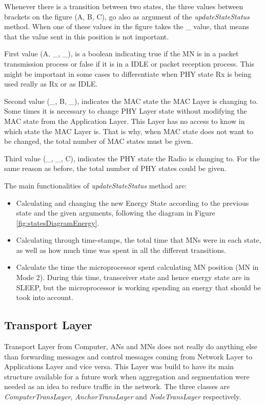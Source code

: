 Whenever there is a transition between two states, the three values between brackets on the figure (A, B, C), go also as argument of the 
\textit{updateStateStatus} method. When one of these values in the figure takes the \_ value, that means that the value sent
in this position is not important.

First value (A, \_, \_), is a boolean indicating true if the \ac{MN} is in a packet transmission process or false if it is in a IDLE or packet 
reception process. This might be important in some cases to differentiate when \ac{PHY} state \ac{Rx} is being used really as \ac{Rx} or as
IDLE.

Second value (\_, B, \_), indicates the \ac{MAC} state the \ac{MAC} Layer is changing to. Some times it is necessary to change \ac{PHY} Layer state
without modifying the \ac{MAC} state from the Application Layer. This Layer has no access to know in which state the \ac{MAC} Layer is. That is
why, when \ac{MAC} state does not want to be changed, the total number of \ac{MAC} states must be given.

Third value (\_, \_, C), indicates the \ac{PHY} state the Radio is changing to. For the same reason as before, the total number of \ac{PHY} states
could be given.

The main functionalities of \textit{updateStateStatus} method are:
\begin{itemize}
 \item Calculating and changing the new Energy State according to the previous state and the given arguments, following the diagram in Figure
\ref{fig:statesDiagramEnergy}.
 \item Calculating through time-stamps, the total time that \acp{MN} were in each state, as well as how much time was spent in all the different
transitions.
 \item Calculate the time the microprocessor spent calculating \ac{MN} position (\ac{MN} in Mode 2). During this time, transceiver
state and hence energy state are in SLEEP, but the microprocessor is working spending an energy that should be took into account.
\end{itemize}

\subsection{Transport Layer}

Transport Layer from Computer, \acp{AN} and \acp{MN} does not really do anything else than forwarding messages and control messages coming from 
Network Layer to Applications Layer and vice versa. This Layer was build to have its main structure available for a future work when 
aggregation and segmentation were needed as an idea to reduce traffic in the network. The three classes are \textit{ComputerTransLayer},
\textit{AnchorTransLayer} and \textit{NodeTransLayer} respectively.

